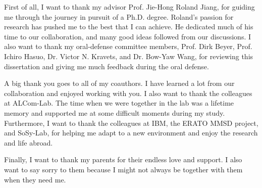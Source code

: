 First of all, I want to thank my advisor Prof. Jie-Hong Roland Jiang, for guiding me through the journey in pursuit of a Ph.D. degree.
Roland's passion for research has pushed me to the best that I can achieve.
He dedicated much of his time to our collaboration, and many good ideas followed from our discussions.
I also want to thank my oral-defense committee members,
Prof. Dirk Beyer, Prof. Ichiro Hasuo, Dr. Victor N. Kravets, and Dr. Bow-Yaw Wang,
for reviewing this dissertation and giving me much feedback during the oral defense.

A big thank you goes to all of my coauthors.
I have learned a lot from our collaboration and enjoyed working with you.
I also want to thank the colleagues at ALCom-Lab.
The time when we were together in the lab was a lifetime memory and supported me at some difficult moments during my study.
Furthermore, I want to thank the colleagues at IBM, the ERATO MMSD project, and SoSy-Lab,
for helping me adapt to a new environment and enjoy the research and life abroad.

Finally, I want to thank my parents for their endless love and support.
I also want to say sorry to them because I might not always be together with them when they need me.